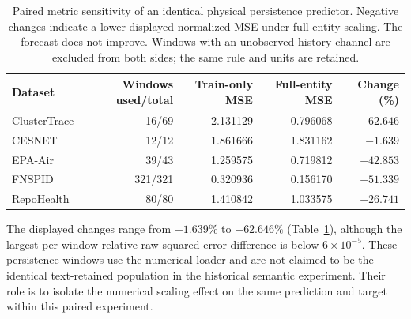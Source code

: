 \begin{table}[htbp]
\centering\small
\caption{Paired metric sensitivity of an identical physical persistence predictor. Negative changes indicate a lower displayed normalized MSE under full-entity scaling. The forecast does not improve. Windows with an unobserved history channel are excluded from both sides; the same rule and units are retained.}
\label{tab:normalization}
\begin{tabular}{lrrrr}
\toprule
Dataset & Windows used/total & Train-only MSE & Full-entity MSE & Change (\%)\\
\midrule
ClusterTrace & 16/69 & 2.131129 & 0.796068 & $-62.646$\\
CESNET & 12/12 & 1.861666 & 1.831162 & $-1.639$\\
EPA-Air & 39/43 & 1.259575 & 0.719812 & $-42.853$\\
FNSPID & 321/321 & 0.320936 & 0.156170 & $-51.339$\\
RepoHealth & 80/80 & 1.410842 & 1.033575 & $-26.741$\\
\bottomrule
\end{tabular}
\end{table}
The displayed changes range from $-1.639\%$ to $-62.646\%$ (Table~\ref{tab:normalization}), although the largest per-window relative raw squared-error difference is below $6\times10^{-5}$. These persistence windows use the numerical loader and are not claimed to be the identical text-retained population in the historical semantic experiment. Their role is to isolate the numerical scaling effect on the same prediction and target within this paired experiment.
